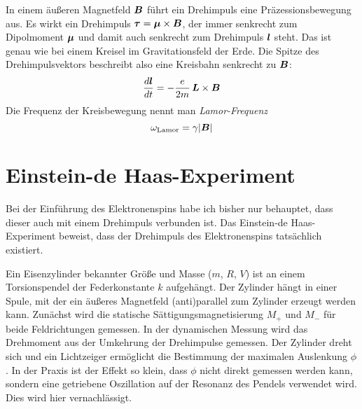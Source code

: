 In einem äußeren Magnetfeld $\boldsymbol{B}$ führt ein Drehimpuls eine Präzessionsbewegung aus. Es wirkt ein Drehimpuls $\boldsymbol{\tau} = \boldsymbol{\mu} \times \boldsymbol{B}$, der immer senkrecht zum Dipolmoment $\boldsymbol{\mu}$ und damit auch senkrecht zum Drehimpuls $\boldsymbol{l}$ steht. Das ist genau wie bei einem Kreisel im Gravitationsfeld der Erde. Die Spitze des Drehimpulsvektors beschreibt also eine Kreisbahn senkrecht zu $\boldsymbol{B}$:
\begin{equation}
    \frac{d \boldsymbol{l}}{dt} = - \frac{e}{2m} \, \boldsymbol{L} \times \boldsymbol{B}
\end{equation}
Die Frequenz der Kreisbewegung nennt man \emph{Lamor-Frequenz}
\begin{equation}
    \omega_\text{Lamor} = \gamma | \boldsymbol{B} |
\end{equation}


\section{Einstein-de Haas-Experiment}


Bei der Einführung des Elektronenspins habe ich bisher nur behauptet, dass dieser auch mit einem Drehimpuls verbunden ist. Das Einstein-de Haas-Experiment beweist, dass der Drehimpuls des Elektronenspins tatsächlich existiert.

Ein Eisenzylinder bekannter Größe und Masse ($m$, $R$, $V$) ist an einem Torsionspendel der Federkonstante $k$ aufgehängt. Der Zylinder hängt in einer Spule, mit der ein äußeres Magnetfeld (anti)parallel zum Zylinder erzeugt werden kann. Zunächst wird die statische Sättigungsmagnetisierung $M_+$ und $M_-$ für beide Feldrichtungen gemessen. In der dynamischen Messung wird das Drehmoment aus der Umkehrung der Drehimpulse gemessen. Der Zylinder dreht sich und ein Lichtzeiger ermöglicht die Bestimmung der maximalen Auslenkung $\phi$. In der Praxis ist der Effekt so klein, dass $\phi$ nicht direkt gemessen werden kann, sondern eine getriebene Oszillation auf der Resonanz des Pendels verwendet wird. Dies wird hier vernachlässigt. 

